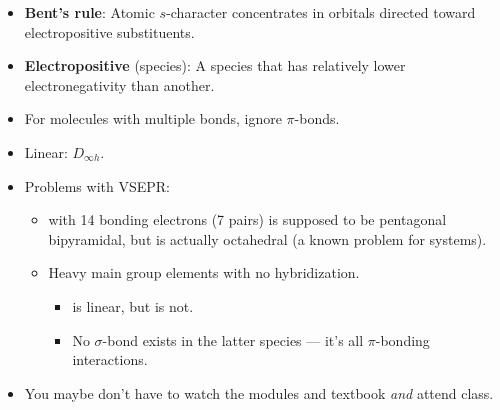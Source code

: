 \documentclass[../main.tex]{subfiles}
\begin{document}
\begin{itemize}
\begin{itemize}
    \end{itemize}
    \item \textbf{Bent's rule}: Atomic $s$-character concentrates in orbitals directed toward electropositive substituents.
    \item \textbf{Electropositive} (species): A species that has relatively lower electronegativity than another.
    \item For molecules with multiple bonds, ignore $\pi$-bonds.
    \item Linear: $D_{\infty h}$.
    \item Problems with VSEPR:
    \begin{itemize}
        \item {} with 14 bonding electrons (7 pairs) is supposed to be pentagonal bipyramidal, but is actually octahedral (a known problem for  systems).
        \item Heavy main group elements with no hybridization.
        \begin{itemize}
            \item {} is linear, but  is not.
            \item No $\sigma$-bond exists in the latter species --- it's all $\pi$-bonding interactions.
        \end{itemize}
    \end{itemize}
    \item You maybe don't have to watch the modules and textbook \emph{and} attend class.
\end{itemize}
\end{document}
